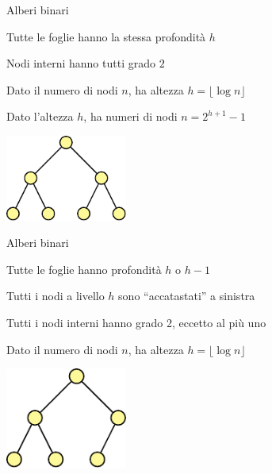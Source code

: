 \begin{frame}{Alberi binari}

\begin{myboxtitle}
\BIL
\item Tutte le foglie hanno la stessa profondità $h$
\item Nodi interni hanno tutti grado $2$
\item Dato il numero di nodi $n$, ha altezza $h = \lfloor \log n \rfloor$
\item Dato l'altezza $h$, ha numeri di nodi $n=2^{h+1}-1$
\EIL
\end{myboxtitle}

\centering
\includegraphics[width=4cm]{perfetto.pdf}

\end{frame}

\begin{frame}{Alberi binari}

\begin{myboxtitle}
\BIL
\item Tutte le foglie hanno profondità $h$ o $h-1$
\item Tutti i nodi a livello $h$ sono “accatastati” a sinistra
\item Tutti i nodi interni hanno grado 2, eccetto al più uno
\item Dato il numero di nodi $n$, ha altezza $h = \lfloor \log n \rfloor$
\EIL
\end{myboxtitle}

\centering
\includegraphics[width=4cm]{completo.pdf}

\end{frame}

